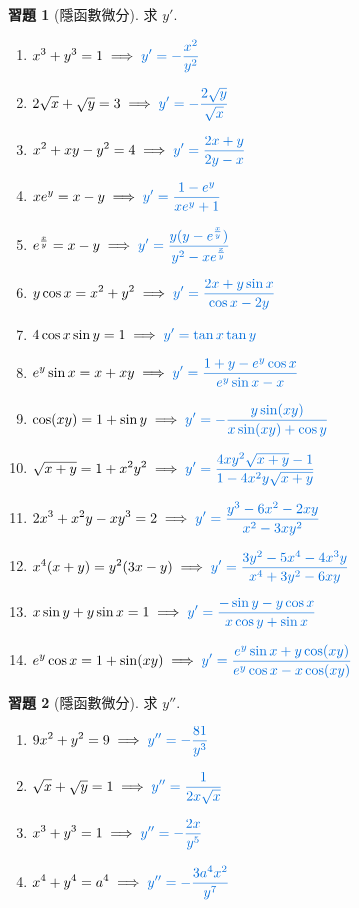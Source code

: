 \documentclass[12pt]{extarticle}
\newcommand{\ds}{\displaystyle}
\newcommand{\ie}{\;\Longrightarrow\;}
\theoremstyle{definition}
\newtheorem*{exe}{習題}
\begin{document}
\begin{exe}[隱函數微分] 求 $y'$.  
  \vspace{-2mm}
  \setlength{\columnsep}{-20mm}
  \begin{multicols}{2}
    \begin{enumerate}\setlength{\itemsep}{0pt}
      \item $\ds x^3 + y^3 = 1 \ie {\color{C2}y' = -\frac{x^2}{y^2}}$
      \item $\ds 2\sqrt{x} + \sqrt{y} = 3 \ie {\color{C2}y' = -\frac{2\sqrt{y}}{\sqrt{x}}}$
      \item $\ds x^2 + xy - y^2 = 4 \ie {\color{C2}y' = \frac{2 x + y}{2 y - x}}$
      \item $\ds xe^y = x - y \ie {\color{C2}y' = \frac{1 - e^y}{xe^y + 1}}$
      \item $\ds e^{\frac{x}{y}} = x - y\ie {\color{C2}y' = \frac{y(y - e^{\frac{x}{y}})}{y^2 - xe^{\frac{x}{y}}}}$
      \item $\ds y\cos x = x^2 + y^2 \ie {\color{C2}y' = \frac{2x + y\sin x}{\cos x - 2y}}$
      \item $\ds 4\cos x\sin y = 1\ie {\color{C2}y' = \tan x\tan y}$
      \item $\ds e^y\sin x = x + xy\ie {\color{C2}y' = \frac{1 + y - e^y\cos x}{e^y\sin x - x}}$
      \item $\ds \cos(xy) = 1 + \sin y\ie {\color{C2}y' = -\frac{y\sin(xy)}{x\sin(xy) + \cos y}}$
      \item $\ds \sqrt{x + y} = 1 + x^2y^2 \ie {\color{C2}y' = \frac{4xy^2\sqrt{x + y} - 1}{1 - 4x^2y\sqrt{x + y}}}$
      \item $\ds 2x^3 + x^2y - xy^3 = 2 \ie {\color{C2}y' = \frac{y^3-6x^2-2xy}{x^2-3xy^2}}$
      \item $\ds x^4(x + y) = y^2(3x -y) \ie {\color{C2}y' = \frac{3y^2-5x^4-4x^3y}{x^4 +3y^2 - 6xy}}$
      \item $\ds x\sin y + y\sin x= 1 \ie {\color{C2}y' = \frac{-\sin y - y\cos x}{x\cos y + \sin x}}$
      \item $\ds e^y\cos x = 1 + \sin(xy)\ie {\color{C2}y' = \frac{e^y\sin x + y\cos(xy)}{e^y\cos x - x\cos(xy)}}$
    \end{enumerate} 
  \end{multicols}
\end{exe}

\begin{exe}[隱函數微分] 求 $y''$.  
  \vspace{-2mm}
  \setlength{\columnsep}{-20mm}
  \begin{multicols}{2}
    \begin{enumerate}\setlength{\itemsep}{0pt}
      \item $\ds 9x^2 + y^2 = 9 \ie {\color{C2}y'' = -\frac{81}{y^3}}$
      \item $\ds \sqrt{x} + \sqrt{y} = 1 \ie {\color{C2}y'' = \frac{1}{2x\sqrt{x}}}$
      \item $\ds x^3 + y^3 = 1 \ie {\color{C2}y'' = -\frac{2 x}{y^5}}$
      \item $\ds x^4 + y^4 = a^4 \ie {\color{C2}y'' = -\frac{3a^4x^2}{y^7}}$
    \end{enumerate} 
  \end{multicols}
\end{exe}
\end{document}
